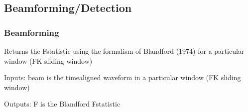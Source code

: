 \documentclass[letterpaper,10pt,english]{sphinxmanual}
\begin{document}
\subsection{Beamforming/Detection}
\label{\detokenize{infrapy.detection:beamforming-detection}}\label{\detokenize{infrapy.detection::doc}}

\subsubsection{Beamforming}
\label{\detokenize{infrapy.detection:module-infrapy.detection.beamforming}}\label{\detokenize{infrapy.detection:beamforming}}

\begin{fulllineitems}
\label{\detokenize{infrapy.detection:infrapy.detection.beamforming.AIC}}
\end{fulllineitems}


\begin{fulllineitems}
\label{\detokenize{infrapy.detection:infrapy.detection.beamforming.MDL}}
\end{fulllineitems}


\begin{fulllineitems}
\label{\detokenize{infrapy.detection:infrapy.detection.beamforming.bfstat}}
Returns the F\sphinxhyphen{}statistic using the formalism of Blandford (1974) for a particular window
(FK sliding window)

Inputs:
\sphinxhyphen{} beam is the time\sphinxhyphen{}aligned waveform in a particular window (FK sliding window)

Outputs:
\sphinxhyphen{} F is the Blandford F\sphinxhyphen{}statistic

\end{fulllineitems}
\end{document}
